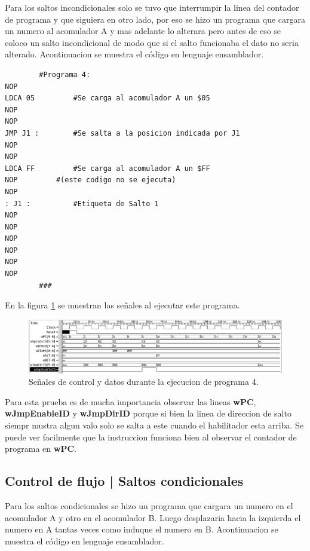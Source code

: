\documentclass[paper=letter, fontsize=12pt]{article}
\begin{document}
Para los saltos incondicionales solo se tuvo que interrumpir la linea del contador de programa y que siguiera en otro lado, por eso se hizo un programa que cargara un numero al acomulador A y mas adelante lo alterara pero antes de eso se coloco un salto incondicional de modo que si el salto funcionaba el dato no seria alterado. Acontinuacion se muestra el código en lenguaje ensamblador.

\begin{lstlisting}
		#Programa 4:
NOP
LDCA 05			#Se carga al acomulador A un $05
NOP
NOP
JMP J1 :		#Se salta a la posicion indicada por J1
NOP
NOP
LDCA FF			#Se carga al acomulador A un $FF
NOP			#(este codigo no se ejecuta)
NOP
: J1 :			#Etiqueta de Salto 1
NOP
NOP
NOP
NOP
NOP
NOP
		###
\end{lstlisting}

En la figura \ref{i:p4} se muestran las señales al ejecutar este programa.\\

\begin{figure}[hbtp]
\centering
\includegraphics[width=1\linewidth]{../media/Prog4.png}
\caption{Señales de control y datos durante la ejecucion de programa 4.}
\label{i:p4}
\end{figure}

Para esta prueba es de mucha importancia observar las lineas \textbf{wPC}, \textbf{wJmpEnableID} y \textbf{wJmpDirID} porque si bien la linea de direccion de salto siempr mustra algun valo solo se salta a este cuando el habilitador esta arriba. Se puede ver facilmente que la instruccion funciona bien al observar el contador de programa en \textbf{wPC}.

\subsection{Control de flujo | Saltos condicionales}

Para los saltos condicionales se hizo un programa que cargara un numero en el acomulador A y otro en el acomulador B. Luego desplazaria hacia la izquierda el numero en A tantas veces como induque el numero en B. Acontinuacion se muestra el código en lenguaje ensamblador.
\end{document}
